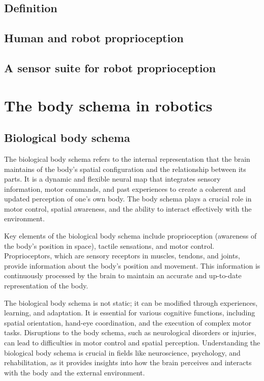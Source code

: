 \subsection{Definition}
\subsection{Human and robot proprioception}
\subsection{A sensor suite for robot proprioception}


\section{The body schema in robotics}

\subsection{Biological body schema}
The biological body schema refers to the internal representation that the brain maintains of the body's spatial configuration and the relationship between its parts. It is a dynamic and flexible neural map that integrates sensory information, motor commands, and past experiences to create a coherent and updated perception of one's own body. The body schema plays a crucial role in motor control, spatial awareness, and the ability to interact effectively with the environment.

Key elements of the biological body schema include proprioception (awareness of the body's position in space), tactile sensations, and motor control. Proprioceptors, which are sensory receptors in muscles, tendons, and joints, provide information about the body's position and movement. This information is continuously processed by the brain to maintain an accurate and up-to-date representation of the body.

The biological body schema is not static; it can be modified through experiences, learning, and adaptation. It is essential for various cognitive functions, including spatial orientation, hand-eye coordination, and the execution of complex motor tasks. Disruptions to the body schema, such as neurological disorders or injuries, can lead to difficulties in motor control and spatial perception. Understanding the biological body schema is crucial in fields like neuroscience, psychology, and rehabilitation, as it provides insights into how the brain perceives and interacts with the body and the external environment.


